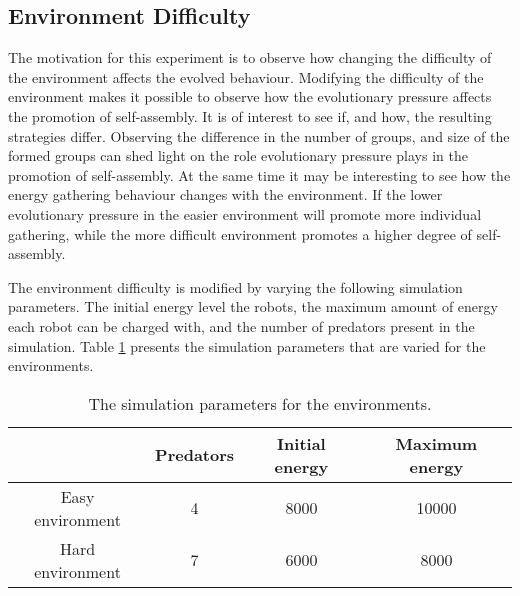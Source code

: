 \begin{figure}[H]
	
\end{figure}

\begin{figure}[H]
	
\end{figure}

\begin{figure}[H]
	
\end{figure}

\begin{figure}[H]
	
\end{figure}

\subsection{Environment Difficulty}
The motivation for this experiment is to observe how changing the difficulty of the environment affects the evolved behaviour.
Modifying the difficulty of the environment makes it possible to observe how the evolutionary pressure affects the promotion of self-assembly.
It is of interest to see if, and how, the resulting strategies differ.
Observing the difference in the number of groups, and size of the formed groups can shed light on the role evolutionary pressure plays in the promotion of self-assembly.
At the same time it may be interesting to see how the energy gathering behaviour changes with the environment.
If the lower evolutionary pressure in the easier environment will promote more individual gathering, while the more difficult environment promotes a higher degree of self-assembly.


The environment difficulty is modified by varying the following simulation parameters.
The initial energy level the robots, the maximum amount of energy each robot can be charged with, and the number of predators present in the simulation.
Table \ref{tab-environment} presents the simulation parameters that are varied for the environments.

\begin{table}
	\centering
	\begin{tabular}{|c|c|c|c|}
		\hline  & Predators & Initial energy & Maximum energy \\ 
		\hline Easy environment & 4 & 8000 & 10000 \\ 
		\hline Hard environment & 7 & 6000 & 8000 \\ 
		\hline 
		
	\end{tabular} 
	\label{tab-environment}
	\caption{The simulation parameters for the environments.}
\end{table}


